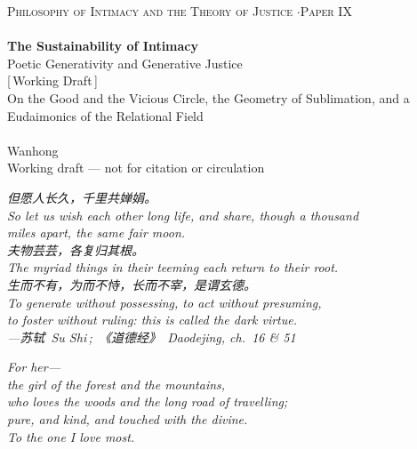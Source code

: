 \documentclass[11pt,a4paper]{article}
\begin{document}
\thispagestyle{empty}
\begin{center}
\vspace*{2cm}
{\footnotesize\color{rosedeep}\scshape Philosophy of Intimacy and the Theory of Justice \quad$\cdot$\quad Paper IX}\\[0.3cm]
\coverrule\\[1.2cm]
{\LARGE\bfseries\color{warnred} The Sustainability of Intimacy}\\[0.7cm]
{\large\color{warnred} Poetic Generativity and Generative Justice}\\[0.8cm]
{\small\color{gold} [\,Working Draft\,]}\\[0.8cm]
{\normalsize\color{inksoft} On the Good and the Vicious Circle, the Geometry of Sublimation, and a Eudaimonics of the Relational Field}\\[2cm]
\coverrule[0.25]\\[0.6cm]
{\normalsize\color{inksoft} Wanhong}\\
\vfill
{\footnotesize\color{gold} Working draft --- not for citation or circulation}
\coverfootnote
\end{center}
\newpage

\thispagestyle{empty}
\vspace*{2.4cm}
\begin{center}
\begin{minipage}{0.74\linewidth}
\centering\itshape\color{rose}
{\cjk 但愿人长久，千里共婵娟。}\\[0.3em]
So let us wish each other long life, and share, though a thousand\\miles apart, the same fair moon.\\[0.8em]
{\cjk 夫物芸芸，各复归其根。}\\[0.3em]
The myriad things in their teeming each return to their root.\\[0.8em]
{\cjk 生而不有，为而不恃，长而不宰，是谓玄德。}\\[0.3em]
To generate without possessing, to act without presuming,\\to foster without ruling: this is called the dark virtue.\\[0.6em]
{\upshape\footnotesize\color{gold} ---{\cjk 苏轼}\ Su Shi\,;\ {\cjk《道德经》}\ \emph{Daodejing}, ch.~16 \& 51}
\end{minipage}
\end{center}
\newpage

\thispagestyle{empty}
\vspace*{4.5cm}
\begin{center}
\begin{minipage}{0.7\linewidth}
\centering\itshape\color{rose}
For her---\\[0.7em]
\upshape the girl of the forest and the mountains,\\[0.3em]
who loves the woods and the long road of travelling;\\[0.7em]
\itshape pure, and kind, and touched with the divine.\\[1.0em]
{\upshape\footnotesize\color{gold} To the one I love most.}
\end{minipage}
\end{center}
\newpage
\end{document}
